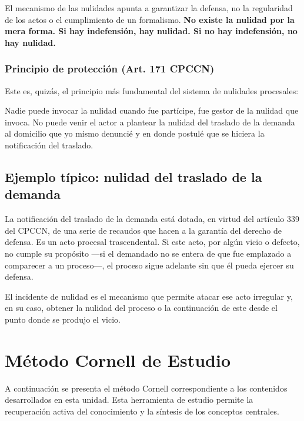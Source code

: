 \documentclass[12pt,oneside]{book}
\begin{document}
El mecanismo de las nulidades apunta a garantizar la defensa, no la regularidad de los actos o el cumplimiento de un formalismo. \textbf{No existe la nulidad por la mera forma. Si hay indefensión, hay nulidad. Si no hay indefensión, no hay nulidad.}

\subsection{Principio de protección (Art. 171 CPCCN)}

Este es, quizás, el principio más fundamental del sistema de nulidades procesales:

\begin{important}
Nadie puede invocar la nulidad cuando fue partícipe, fue gestor de la nulidad que invoca. No puede venir el actor a plantear la nulidad del traslado de la demanda al domicilio que yo mismo denuncié y en donde postulé que se hiciera la notificación del traslado.
\end{important}

\section{Ejemplo típico: nulidad del traslado de la demanda}

La notificación del traslado de la demanda está dotada, en virtud del artículo 339 del CPCCN, de una serie de recaudos que hacen a la garantía del derecho de defensa. Es un acto procesal trascendental. Si este acto, por algún vicio o defecto, no cumple su propósito ---si el demandado no se entera de que fue emplazado a comparecer a un proceso---, el proceso sigue adelante sin que él pueda ejercer su defensa.

El incidente de nulidad es el mecanismo que permite atacar ese acto irregular y, en su caso, obtener la nulidad del proceso o la continuación de este desde el punto donde se produjo el vicio.


\chapter{Método Cornell de Estudio}

A continuación se presenta el método Cornell correspondiente a los contenidos desarrollados en esta unidad. Esta herramienta de estudio permite la recuperación activa del conocimiento y la síntesis de los conceptos centrales.
\end{document}
